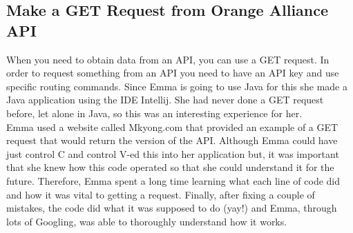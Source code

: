 \documentclass{article}
\begin{document}
\subsection{Make a GET Request from Orange Alliance API}
When you need to obtain data from an API, you can use a GET request. In order to request something from an API you need to have an API key and use specific routing commands. Since Emma is going to use Java for this she made a Java application using the IDE Intellij. She had never done a GET request before, let alone in Java, so this was an interesting experience for her. \\

Emma used a website called Mkyong.com that provided an example of a GET request that would return the version of the API. Although Emma could have just control C and control V-ed this into her application but, it was important that she knew how this code operated so that she could understand it for the future. Therefore, Emma spent a long time learning what each line of code did and how it was vital to getting a request. Finally, after fixing a couple of mistakes, the code did what it was supposed to do (yay!) and Emma, through lots of Googling, was able to thoroughly understand how it works. \\
\end{document}
